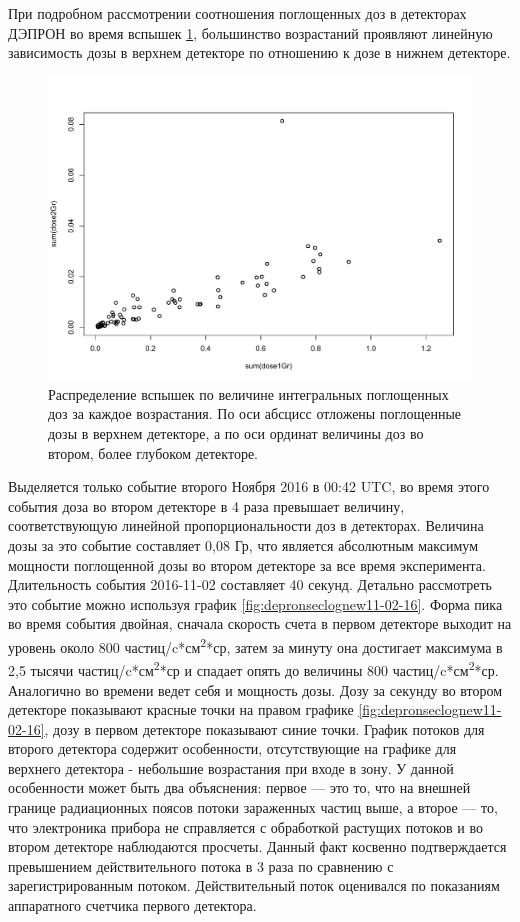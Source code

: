 При подробном рассмотрении соотношения поглощенных доз в детекторах ДЭПРОН во время вспышек \ref{fig:rplot03}, большинство возрастаний проявляют линейную зависимость дозы в верхнем детекторе по отношению к дозе в нижнем детекторе.
\begin{figure}
	\centering
	\includegraphics[width=0.7\linewidth]{images/Flash/Rplot03}
	\caption{Распределение вспышек по величине интегральных поглощенных доз за каждое возрастания. По оси абсцисс отложены поглощенные дозы в верхнем детекторе, а по оси ординат величины доз во втором, более глубоком детекторе.}
	\label{fig:rplot03}
\end{figure} 
Выделяется только событие второго Ноября 2016 в 00:42 UTC, во время этого события доза во втором детекторе в 4 раза превышает величину, соответствующую линейной пропорциональности доз в детекторах. Величина дозы за это событие составляет 0,08 Гр, что является абсолютным максимум мощности поглощенной дозы во втором детекторе за все время эксперимента. Длительность события 2016-11-02 составляет 40 секунд. Детально рассмотреть это событие можно используя график 	\ref{fig:depronseclognew11-02-16}. Форма пика во время события двойная, сначала скорость счета в первом детекторе выходит на уровень около 800 частиц/c*см\textsuperscript{2}*ср, затем за минуту она достигает максимума в 2,5 тысячи частиц/c*см\textsuperscript{2}*ср и спадает опять до величины 800 частиц/c*см\textsuperscript{2}*ср. Аналогично во времени ведет себя и мощность дозы.  Дозу за секунду во втором детекторе показывают красные точки на правом графике \ref{fig:depronseclognew11-02-16}, дозу в первом детекторе показывают синие точки. График потоков для второго детектора содержит особенности, отсутствующие на графике для верхнего детектора - небольшие возрастания при входе в зону. У данной особенности может быть два объяснения: первое --- это то, что на внешней границе радиационных поясов потоки зараженных частиц выше, а второе --- то, что электроника прибора не справляется с обработкой растущих потоков и во втором детекторе наблюдаются просчеты. Данный факт косвенно подтверждается превышением действительного потока в 3 раза по сравнению с зарегистрированным потоком. Действительный поток оценивался по показаниям аппаратного счетчика первого детектора.

